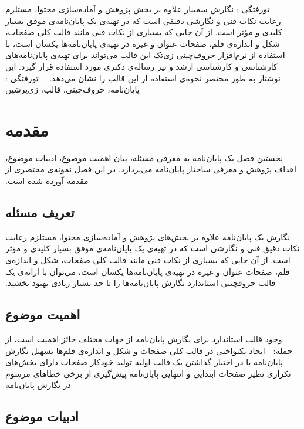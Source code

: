 ‫
‫%
‫%
‫%
‫‌تورفتگی : نگارش سمینار‌ علاوه بر بخش پژوهش و آماده‌سازی محتوا،
‫مستلزم رعایت نکات فنی و نگارشی دقیقی است
‫که در تهیه‌ی یک پایان‌نامه‌ی موفق بسیار کلیدی و مؤثر است.
‫از آن جایی که بسیاری از نکات فنی مانند قالب کلی صفحات، شکل و اندازه‌ی قلم، صفحات عنوان و غیره در تهیه‌ی پایان‌نامه‌ها یکسان است، با استفاده از نرم‌افزار حروف‌چینی زی‌تک %
‫این قالب می‌تواند برای تهیه‌ی پایان‌نامه‌های کارشناسی و کارشناسی ارشد و نیز رساله‌ی دکتری مورد استفاده قرار گیرد.
‫این نوشتار به طور مختصر نحوه‌ی استفاده از این قالب را نشان می‌دهد.
‫
‫
‫%
‫‌تورفتگی :
‫پایان‌نامه، حروف‌چینی، قالب، زی‌پرشین
‫%
‫‫
‫\section{مقدمه}
‫
‫نخستین فصل یک پایان‌نامه به معرفی مسئله، بیان اهمیت موضوع، ادبیات موضوع،
‫اهداف پژوهش و معرفی ساختار پایان‌نامه می‌پردازد.
‫در این فصل نمونه‌ی مختصری از مقدمه آورده شده است.
‫
‫\subsection{تعریف مسئله}
‫
‫نگارش یک پایان‌نامه‌ علاوه بر بخش‌های پژوهش و آماده‌سازی محتوا،
‫مستلزم رعایت نکات دقیق فنی و نگارشی است
‫که در تهیه‌ی یک پایان‌نامه‌ی موفق بسیار کلیدی و مؤثر است.
‫از آن جایی که بسیاری از نکات فنی مانند قالب کلی صفحات، شکل و اندازه‌ی قلم،
‫صفحات عنوان و غیره در تهیه‌ی پایان‌نامه‌ها یکسان است،
‫می‌توان با ارائه‌ی یک قالب حروفچینی استاندارد
‫نگارش پایان‌نامه‌ها را تا حد بسیار زیادی بهبود بخشید.
‫
‫
‫\subsection{اهمیت موضوع}
‫
‫وجود قالب استاندارد برای نگارش پایان‌نامه از جهات مختلف حائز اهمیت است، از جمله:
‫
‫
‫ ایجاد یکنواختی در قالب کلی صفحات و شکل و اندازه‌ی قلم‌ها
‫ تسهیل نگارش پایان‌نامه با در اختیار گذاشتن یک قالب اولیه
‫ تولید خودکار صفحات دارای بخش‌های تکراری نظیر صفحات ابتدایی و انتهایی پایان‌نامه
‫ پیش‌گیری از برخی خطاهای مرسوم در نگارش پایان‌نامه
‫
‫
‫\subsection{ادبیات موضوع}
